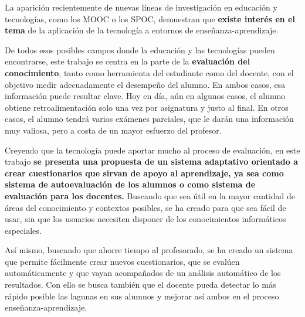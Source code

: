 La aparición recientemente de nuevas líneas de investigación en educación y tecnologías, como los \acrshort{MOOC} o los \acrshort{SPOC}, demuestran que \textbf{existe interés en el tema} de la aplicación de la tecnología a entornos de enseñanza-aprendizaje.

De todos esos posibles campos donde la educación y las tecnologías pueden encontrarse, este trabajo se centra en la parte de la \textbf{evaluación del conocimiento}, tanto como herramienta del estudiante como del docente, con el objetivo medir adecuadamente el desempeño del alumno. En ambos casos, esa información puede resultar clave. Hoy en día, aún en algunos casos, el alumno obtiene retroalimentación solo una vez por asignatura y justo al final. En otros casos, el alumno tendrá varios exámenes parciales, que le darán una información muy valiosa, pero a costa de un mayor esfuerzo del profesor.

Creyendo que la tecnología puede aportar mucho al proceso de evaluación, en este trabajo \textbf{se presenta una propuesta de un sistema adaptativo orientado a crear cuestionarios que sirvan de apoyo al aprendizaje, ya sea como sistema de autoevaluación de los alumnos o como sistema de evaluación para los docentes.} 
Buscando que sea útil en la mayor cantidad de áreas del conocimiento y  contextos posibles, se ha creado para que sea fácil de usar, sin que los usuarios necesiten disponer de los conocimientos informáticos especiales. 

Así mismo, buscando que ahorre tiempo al profesorado, se ha creado un sistema que permite fácilmente crear nuevos cuestionarios, que se evalúen automáticamente y que vayan acompañados de un análisis automático de los resultados. Con ello se busca también que el docente pueda detectar lo más rápido posible las lagunas en sus alumnos y mejorar así ambos en el proceso enseñanza-aprendizaje.




